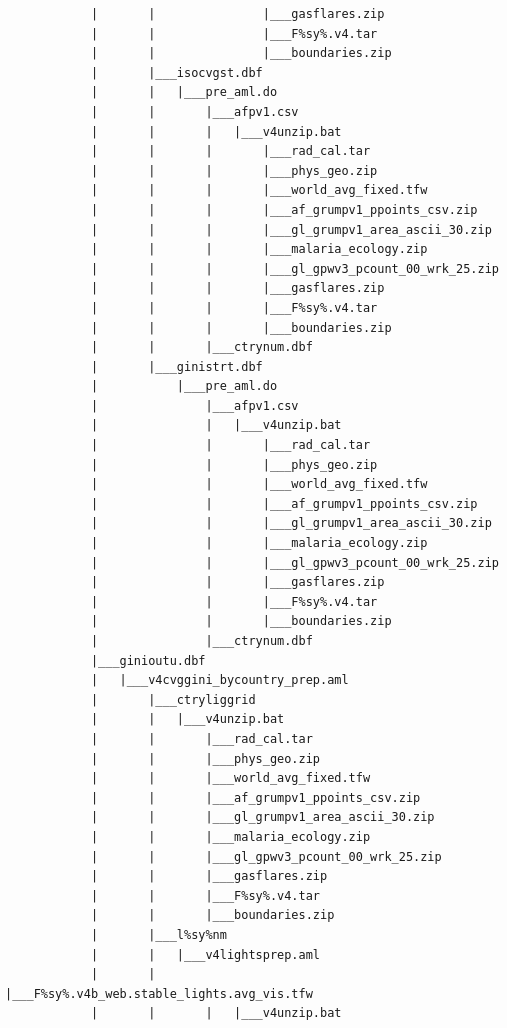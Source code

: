 \documentclass[
]{book}
\begin{document}
\begin{verbatim}
            |       |               |___gasflares.zip
            |       |               |___F%sy%.v4.tar
            |       |               |___boundaries.zip
            |       |___isocvgst.dbf
            |       |   |___pre_aml.do
            |       |       |___afpv1.csv
            |       |       |   |___v4unzip.bat
            |       |       |       |___rad_cal.tar
            |       |       |       |___phys_geo.zip
            |       |       |       |___world_avg_fixed.tfw
            |       |       |       |___af_grumpv1_ppoints_csv.zip
            |       |       |       |___gl_grumpv1_area_ascii_30.zip
            |       |       |       |___malaria_ecology.zip
            |       |       |       |___gl_gpwv3_pcount_00_wrk_25.zip
            |       |       |       |___gasflares.zip
            |       |       |       |___F%sy%.v4.tar
            |       |       |       |___boundaries.zip
            |       |       |___ctrynum.dbf
            |       |___ginistrt.dbf
            |           |___pre_aml.do
            |               |___afpv1.csv
            |               |   |___v4unzip.bat
            |               |       |___rad_cal.tar
            |               |       |___phys_geo.zip
            |               |       |___world_avg_fixed.tfw
            |               |       |___af_grumpv1_ppoints_csv.zip
            |               |       |___gl_grumpv1_area_ascii_30.zip
            |               |       |___malaria_ecology.zip
            |               |       |___gl_gpwv3_pcount_00_wrk_25.zip
            |               |       |___gasflares.zip
            |               |       |___F%sy%.v4.tar
            |               |       |___boundaries.zip
            |               |___ctrynum.dbf
            |___ginioutu.dbf
            |   |___v4cvggini_bycountry_prep.aml
            |       |___ctryliggrid
            |       |   |___v4unzip.bat
            |       |       |___rad_cal.tar
            |       |       |___phys_geo.zip
            |       |       |___world_avg_fixed.tfw
            |       |       |___af_grumpv1_ppoints_csv.zip
            |       |       |___gl_grumpv1_area_ascii_30.zip
            |       |       |___malaria_ecology.zip
            |       |       |___gl_gpwv3_pcount_00_wrk_25.zip
            |       |       |___gasflares.zip
            |       |       |___F%sy%.v4.tar
            |       |       |___boundaries.zip
            |       |___l%sy%nm
            |       |   |___v4lightsprep.aml
            |       |       |___F%sy%.v4b_web.stable_lights.avg_vis.tfw
            |       |       |   |___v4unzip.bat

\end{verbatim}
\end{document}

